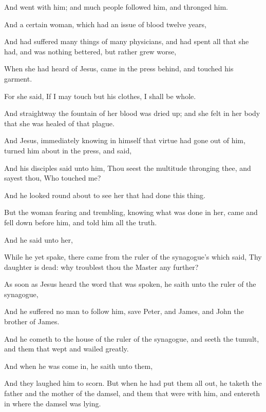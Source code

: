{And
{}
went
with
him;
and
much
people
followed
him,
and
thronged
him.

And
a
certain
woman, which
had an
issue of
blood
twelve
years,

And had
suffered many
things
of
many
physicians,
and had
spent
all
that
she
had,
and
was
nothing
bettered,
but
rather
grew
worse,

When she had
heard
of
Jesus,
came
in the
press
behind, and
touched
his
garment.

For she
said,
If I may
touch
but
his
clothes, I shall be
whole.

And
straightway the
fountain
of
her
blood was dried
up;
and she
felt in her
body
that she was
healed
of that
plague.

And
Jesus,
immediately
knowing
in
himself
that
virtue had gone
out
of
him, turned him
about
in the
press, and
said,
{}

And
his
disciples
said unto
him, Thou
seest the
multitude
thronging
thee,
and sayest
thou,
Who
touched
me?

And he looked round
about to
see her that had
done this
thing.

But the
woman
fearing
and
trembling,
knowing
what was
done
in
her,
came
and fell down
before
him,
and
told
him
all the
truth.

And he
said unto
her,
{}

While
he
yet
spake, there
came
from the ruler of the
synagogue’s
{} which
said,
Thy
daughter is
dead:
why troublest
thou the
Master any
further?

As soon
as
Jesus
heard the
word that was
spoken, he
saith unto the ruler of the
synagogue,
{}

And he
suffered no
man to
follow
him,
save
Peter,
and
James,
and
John the
brother of
James.

And he
cometh
to the
house of the ruler of the
synagogue,
and
seeth the
tumult, and them that
wept
and
wailed
greatly.

And when he was come
in, he
saith unto
them,
{}

And they
laughed
him to
scorn.
But when he had put
them
all
out, he
taketh the
father
and the
mother of the
damsel,
and them that were
with
him,
and entereth
in
where the
damsel
was
lying.

}
